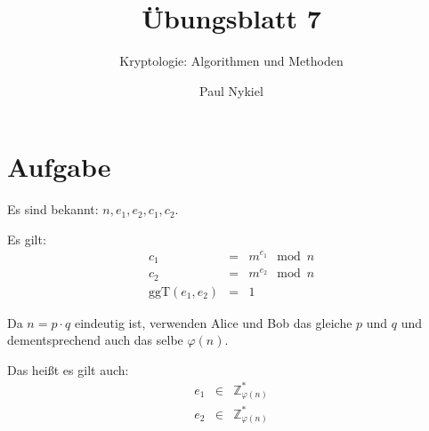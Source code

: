 \documentclass[DIN, pagenumber=false, fontsize=11pt, parskip=half]{scrartcl}
\title{Übungsblatt 7}
\subtitle{Kryptologie: Algorithmen und Methoden}
\author{Paul Nykiel}
\begin{document}
    \maketitle
    \section{Aufgabe}
    Es sind bekannt: $n, e_1, e_2, c_1, c_2$.

    Es gilt:
    \begin{eqnarray}
        c_1 &=& m^{e_1} \mod n \\
        c_2 &=& m^{e_2} \mod n \\
        \text{ggT}(e_1, e_2) &=& 1
    \end{eqnarray}
    
    Da $n = p \cdot q$ eindeutig ist, verwenden Alice und Bob das gleiche
    $p$ und $q$ und dementsprechend auch das selbe $\varphi(n)$.
    
    Das heißt es gilt auch:
    \begin{eqnarray}
        e_1 &\in& \mathbb{Z}^*_{\varphi(n)} \\
        e_2 &\in& \mathbb{Z}^*_{\varphi(n)}
    \end{eqnarray}
\end{document}
